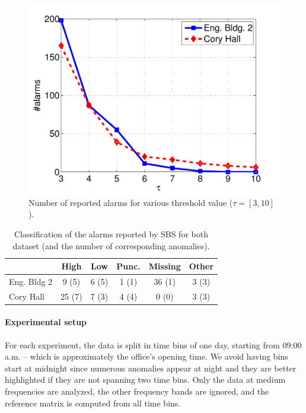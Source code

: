 
\begin{figure}
\begin{center}
 \includegraphics[width=.49\textwidth]{figs/threshold-eps-converted-to.pdf}
 \caption{Number of reported alarms for various threshold value ($\tau=[3,10]$).}
 \label{fig:thres}
 \end{center}
\end{figure}

\begin{table}
\begin{center}
\begin{tabular}{|l||c|c|c|c|c|}
\hline
&High&Low&Punc.&Missing&Other\\ \hline \hline
Eng. Bldg 2 & 9 (5) & 6 (5) & 1 (1) & 36 (1) & 3 (3) \\ \hline
Cory Hall & 25 (7) & 7 (3) & 4 (4) & 0 (0) & 3 (3) \\ \hline
\end{tabular}
\end{center}
\caption{Classification of the alarms reported by SBS for both dataset (and the number of corresponding anomalies).}
\label{tab:classif}
\end{table}

\paragraph{Experimental setup}
For each experiment, the data is split in time bins of one day, starting from 09:00 a.m. -- which is approximately 
the office's opening time.
We avoid having bins start at midnight since numerous anomalies appear at night and they are better highlighted if they are 
not spanning two time bins.
Only the data at medium frequencies are analyzed, the other frequency bands are ignored, and the reference matrix is computed from all time bins.


